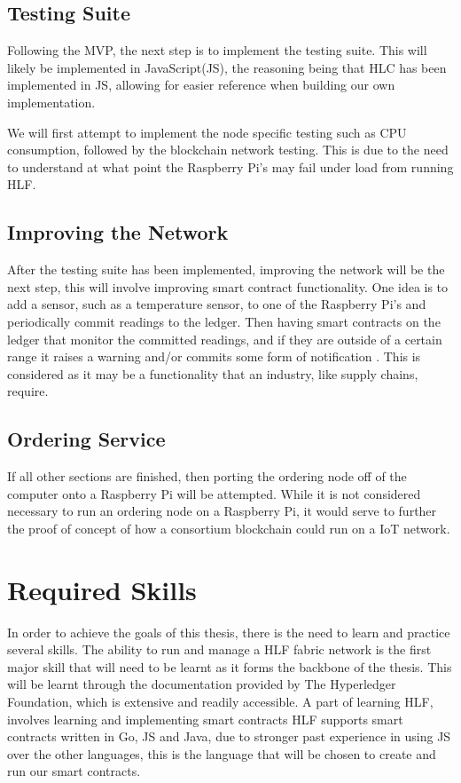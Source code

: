     \subsection{Testing Suite}
    Following the MVP, the next step is to implement the testing suite. This will likely be implemented in JavaScript(JS), the reasoning being that HLC has been implemented in JS, allowing for easier reference when building our own implementation. 
    
    We will first attempt to implement the node specific testing such as CPU consumption, followed by the blockchain network testing. This is due to the need to understand at what point the Raspberry Pi's may fail under load from running HLF.
    
    \subsection{Improving the Network}
    After the testing suite has been implemented, improving the network will be the next step, this will involve improving smart contract functionality. One idea is to add a sensor, such as a temperature sensor, to one of the Raspberry Pi's and periodically commit readings to the ledger. Then having smart contracts on the ledger that monitor the committed readings, and if they are outside of a certain range it raises a warning and/or commits some form of notification . This is considered as it may be a functionality that an industry, like supply chains, require.
    
    \subsection{Ordering Service}
    If all other sections are finished, then porting the ordering node off of the computer onto a Raspberry Pi will be attempted. While it is not considered necessary to run an ordering node on a Raspberry Pi, it would serve to further the proof of concept of how a consortium blockchain could run on a IoT network.
    
    
    
    
    
\section{Required Skills}

In order to achieve the goals of this thesis, there is the need to learn and practice several skills.
The ability to run and manage a HLF fabric network is the first major skill that will need to be learnt as it forms the backbone of the thesis. This will be learnt through the documentation provided by The Hyperledger Foundation, which is extensive and readily accessible. A part of learning HLF, involves learning and implementing smart contracts  HLF supports smart contracts written in Go, JS and Java, due to stronger past experience in using JS over the other languages, this is the language that will be chosen to create and run our smart contracts.

